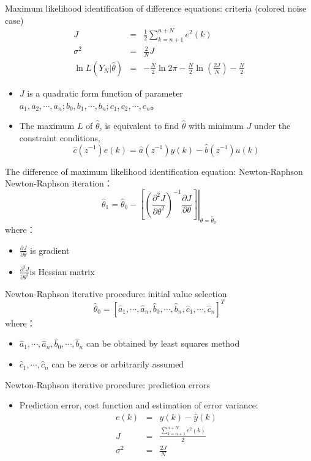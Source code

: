 \begin{frame}{ Maximum likelihood identification of difference equations: criteria (colored noise case) }
\begin{eqnarray*}
J &=& \frac{1}{2}\sum_{k=n+1}^{n+N}e^2(k)  \\
\sigma^2 &=& \frac{2}{N}J  \\
\ln L(Y_N|\hat{\theta}) &=& - \frac{N}{2}\ln{2\pi}-\frac{N}{2}\ln(\frac{2J}{N})-\frac{N}{2}
\end{eqnarray*}
\begin{itemize}
\item $J$ is a quadratic form function of parameter $a_1,a_2,\cdots,a_n;b_0,b_1,\cdots,b_n;c_1,c_2,\cdots,c_n $。
\item The maximum $L$ of $\hat\theta$, is equivalent to find $\hat\theta$ with minimum $J$ under the constraint conditions,
$$
\hat c(z^{-1})e(k)=\hat a(z^{-1})y(k)-\hat b(z^{-1})u(k)
$$
\end{itemize}
\end{frame}

\begin{frame}{ The difference of maximum likelihood identification equation: Newton-Raphson}
Newton-Raphson iteration：
$$
\hat\theta_1=\hat\theta_0-\left.\left[\left(\frac{\partial^2J}{\partial\theta^2}\right)^{-1}\frac{\partial J}{\partial\theta}\right]\right|_{\theta=\hat\theta_0}
$$
where：
\begin{itemize}
\item $\frac{\partial J}{\partial\theta}$ is gradient
\item $\frac{\partial^2J}{\partial\theta^2}$is Hessian matrix 
\end{itemize}
\end{frame}


\begin{frame}{Newton-Raphson iterative procedure: initial value selection }
$$
\hat\theta_0=[\hat a_1,\cdots,\hat a_n,\hat b_0,\cdots,\hat b_n,\hat c_1,\cdots,\hat c_n]^T
$$
where：
\begin{itemize}
\item  $\hat a_1,\cdots,\hat a_n,\hat b_0,\cdots,\hat b_n$ can be obtained by least squares method
\item  $\hat c_1,\cdots,\hat c_n$ can be zeros or arbitrarily assumed
\end{itemize}
\end{frame}

\begin{frame}{Newton-Raphson iterative procedure:  prediction errors }
\begin{itemize}
\item    Prediction error, cost function and estimation of error variance: 
\begin{eqnarray*}
e(k) &=& y(k)-\hat y(k)   \\
J &=& \frac{\sum_{k=n+1}^{n+N}e^2(k)}{2}    \\
\sigma^2 &=& \frac{2J}{N}
\end{eqnarray*}
\end{itemize}
\end{frame}

